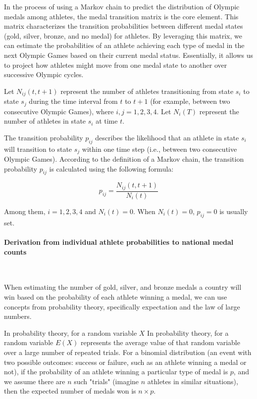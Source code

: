 \documentclass[12pt]{article}
\begin{document}
In the process of using a Markov chain to predict the distribution of Olympic medals among athletes, the medal transition matrix is the core element. This matrix characterizes the transition probabilities between different medal states (gold, silver, bronze, and no medal) for athletes. By leveraging this matrix, we can estimate the probabilities of an athlete achieving each type of medal in the next Olympic Games based on their current medal status. Essentially, it allows us to project how athletes might move from one medal state to another over successive Olympic cycles.

Let $N_{ij}(t,t+1)$ represent the number of athletes transitioning from state $s_i$ to state $s_j$ during the time interval from $t$ to $t+1$ (for example, between two consecutive Olympic Games), where $i,j = 1,2,3,4$. Let $N_i(T)$ represent the number of athletes in state $s_i$ at time $t$.

The transition probability $p_{ij}$ describes the likelihood that an athlete in state $s_i$ will transition to state $s_j$ within one time step (i.e., between two consecutive Olympic Games). According to the definition of a Markov chain, the transition probability $p_{ij}$ is calculated using the following formula:

$$p_{ij} = \frac{N_{ij}(t,t+1)}{N_i(t)}$$

Among them, $i=1,2,3,4$ and $N_i(t)=0$. When $N_i(t)=0$, $p_{ij}=0$ is usually set.

\paragraph{Derivation from individual athlete probabilities to national medal counts} \

When estimating the number of gold, silver, and bronze medals a country will win based on the probability of each athlete winning a medal, we can use concepts from probability theory, specifically expectation and the law of large numbers.

In probability theory, for a random variable $X$ In probability theory, for a random variable $E(X)$ represents the average value of that random variable over a large number of repeated trials. For a binomial distribution (an event with two possible outcomes: success or failure, such as an athlete winning a medal or not), if the probability of an athlete winning a particular type of medal is $p$, and we assume there are $n$ such "trials" (imagine $n$ athletes in similar situations), then the expected number of medals won is $n \times p$.
\end{document}
